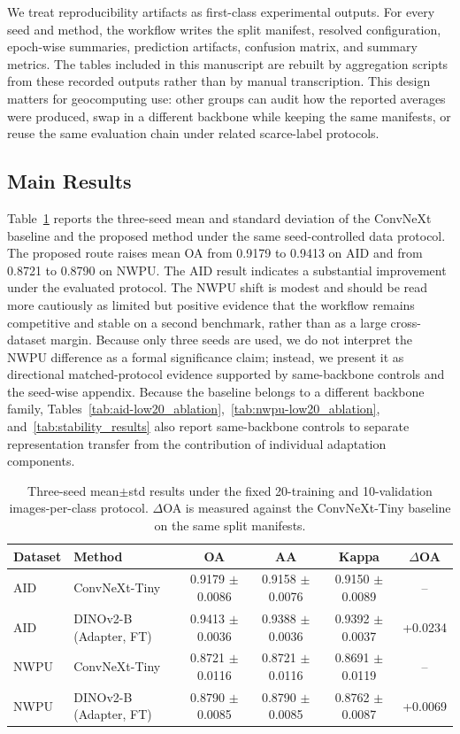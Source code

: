 \documentclass[a4paper,fleqn]{cas-sc}
\begin{document}
We treat reproducibility artifacts as first-class experimental outputs. For every seed and method, the workflow writes the split manifest, resolved configuration, epoch-wise summaries, prediction artifacts, confusion matrix, and summary metrics. The tables included in this manuscript are rebuilt by aggregation scripts from these recorded outputs rather than by manual transcription. This design matters for geocomputing use: other groups can audit how the reported averages were produced, swap in a different backbone while keeping the same manifests, or reuse the same evaluation chain under related scarce-label protocols.

\subsection{Main Results}

Table~\ref{tab:main_results} reports the three-seed mean and standard deviation of the ConvNeXt baseline and the proposed method under the same seed-controlled data protocol. The proposed route raises mean OA from 0.9179 to 0.9413 on AID and from 0.8721 to 0.8790 on NWPU. The AID result indicates a substantial improvement under the evaluated protocol. The NWPU shift is modest and should be read more cautiously as limited but positive evidence that the workflow remains competitive and stable on a second benchmark, rather than as a large cross-dataset margin. Because only three seeds are used, we do not interpret the NWPU difference as a formal significance claim; instead, we present it as directional matched-protocol evidence supported by same-backbone controls and the seed-wise appendix. Because the baseline belongs to a different backbone family, Tables~\ref{tab:aid-low20_ablation},~\ref{tab:nwpu-low20_ablation}, and~\ref{tab:stability_results} also report same-backbone controls to separate representation transfer from the contribution of individual adaptation components.

\begin{table}
  \centering
  \scriptsize
  \setlength{\tabcolsep}{2pt}
  \caption{Three-seed mean$\pm$std results under the fixed 20-training and 10-validation images-per-class protocol. $\Delta$OA is measured against the ConvNeXt-Tiny baseline on the same split manifests.}
  \label{tab:main_results}
  \begin{tabular}{l >{\raggedright\arraybackslash}p{} c c c c}
    \toprule
    Dataset & Method & OA & AA & Kappa & $\Delta$OA \\
    \midrule
    AID & ConvNeXt-Tiny & 0.9179 $\pm$ 0.0086 & 0.9158 $\pm$ 0.0076 & 0.9150 $\pm$ 0.0089 & -- \\
    AID & DINOv2-B (Adapter, FT) & 0.9413 $\pm$ 0.0036 & 0.9388 $\pm$ 0.0036 & 0.9392 $\pm$ 0.0037 & +0.0234 \\
    NWPU & ConvNeXt-Tiny & 0.8721 $\pm$ 0.0116 & 0.8721 $\pm$ 0.0116 & 0.8691 $\pm$ 0.0119 & -- \\
    NWPU & DINOv2-B (Adapter, FT) & 0.8790 $\pm$ 0.0085 & 0.8790 $\pm$ 0.0085 & 0.8762 $\pm$ 0.0087 & +0.0069 \\
    \bottomrule
  \end{tabular}
\end{table}
\end{document}
